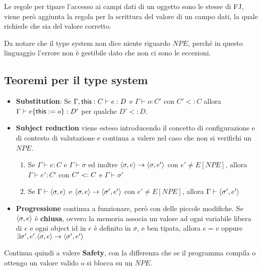 \noindent Le regole per tipare l'accesso ai campi dati di un oggetto sono le stesse di FJ, viene però aggiunta la regola per la scrittura del valore di un campo dati, la quale richiede che sia del valore corretto.

\begin{prooftree}
\end{prooftree}

\noindent Da notare che il type system non dice niente riguardo $NPE$, perché in questo linguaggio l'errore non è gestibile dato che non ci sono le eccezioni.

\subsection{Teoremi per il type system}

\begin{itemize}
	\item \textbf{Substitution}: Se $\Gamma, \this : C \vdash e :D$ e $\Gamma \vdash o:C'$ con $C' <: C$ allora $\Gamma \vdash e\{\this := o \} : D'$ per qualche $D' <: D$.
	\item \textbf{Subject reduction} viene esteso introducendo il concetto di configurazione e di contesto di valutazione e continua a valere nel caso che non si verifichi un $NPE$.
	\begin{enumerate}
		\item Se $\Gamma \vdash e : C$ e $\Gamma \vdash \sigma$ ed inoltre $\LA \sigma,e\RA \to \LA\sigma, e'\RA$ con $e' \neq E[NPE]$, allora $\Gamma \vdash e' :C' $ con $C' \stype C$ e $\Gamma \vdash \sigma'$
		\item Se $\Gamma \vdash \LA \sigma, e\RA$ e $\LA \sigma, e\RA \to \LA \sigma', e'\RA $ con $e'\neq E[NPE]$, allora $\Gamma \vdash \LA \sigma', e'\RA$
	\end{enumerate}
	
	\item \textbf{Progressione} continua a funzionare, però con delle piccole modifiche.
	Se $\LA \sigma, e\RA$ è \textbf{chiusa}, ovvero la memoria associa un valore ad ogni variabile libera di $e$ e ogni object id in $e$ è definito in $\sigma$, e ben tipata, allora $e=v$ oppure $\exists \sigma',e' . \LA \sigma, e\RA \to \LA \sigma', e'\RA$
\end{itemize}

Continua quindi a valere \textbf{Safety}, con la differenza che se il programma compila o ottengo un valore valido o si blocca su un $NPE$. 

